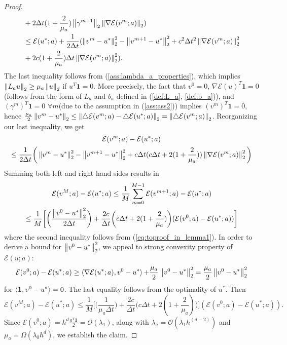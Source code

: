 \begin{thm}
\begin{proof}
\begin{align*}
			&+ 2\Delta t (1+ \frac{2}{\mu_a}) \left\lVert\gamma^{m+1}\right\rVert_{2} \left\lVert\nabla \mathcal{E}(v^m;a)\right\rVert_{2})\\
			&\leq \mathcal{E}(u^*;a) + \frac{1}{2 \Delta t}(\left\lVert v^m-u^*\right\rVert_{2}^{2} - \left\lVert v^{m+1} - u^*\right\rVert_{2}^{2} + c^2 \Delta t^2 \left\lVert\nabla \mathcal{E}(v^m;a)\right\rVert_{2}^{2}\\
			&+ 2c (1+ \frac{2}{\mu_a}) \Delta t \left\lVert\nabla \mathcal{E}(v^m;a)\right\rVert_{2}^{2}).
		\end{align*}
		The last inequality follows from (\ref{ass:lambda_a_properties}), which implies $\left\lVert L_a u\right\rVert_{2} \geq \mu_a \left\lVert u\right\rVert_{2}$ if $u^T\textbf{1}=0$. More precisely, the fact that $v^0 = 0$, $\nabla\mathcal{E}(u)^T \mathbf{1} = 0$ (follows from the form of $L_a$ and $b_a$ defined in (\ref{def:L_a}, \ref{def:b_a})), and $(\gamma^m)^T \textbf{1} = 0$ $\forall m$(due to the assumption in (\ref{ass:ass2})) implies $(v^m)^T \textbf{1} = 0$, hence $\frac{\mu_a}{2} \left\lVert v^m - u^*\right\rVert_{2} \leq \left\lVert\triangle \mathcal{E}(v^m;a) - \triangle \mathcal{E}(u^*;a)\right\rVert_{2} = \left\lVert\triangle \mathcal{E}(v^m;a)\right\rVert_{2}$. Reorganizing our last inequality, we get
		\begin{multline}
			\mathcal{E}(v^m;a) - \mathcal{E}(u^*;a) \\
			\leq \frac{1}{2\Delta t} \bigg(\left\lVert v^m - u^*\right\rVert_{2}^{2} - \left\lVert v^{m+1} - u^*\right\rVert_{2}^{2} +c\Delta t (c\Delta t + 2(1+\frac{2}{\mu_a})) \left\lVert\nabla \mathcal{E}(v^m;a)\right\rVert_{2}^{2} \bigg)
		\end{multline}
		Summing both left and right hand sides results in 
		\begin{multline}
			\mathcal{E}(v^{M};a) - \mathcal{E}(u^*;a) \leq \frac{1}{M} \sum_{m = 0}^{M-1} \mathcal{E}(v^{m+1};a) - \mathcal{E}(u^*;a) \\
			\leq \frac{1}{M} \bigg[ \bigg( \frac{\left\lVert v^0 - u^*\right\rVert_{2}^{2}}{2\Delta t}\bigg) + \frac{2c}{\Delta t} \bigg(c\Delta t + 2(1+\frac{2}{\mu_a})\bigg) (\mathcal{E}(v^0;a) - \mathcal{E}(u^*;a)) \bigg]
		\end{multline}
		where the second inequality follows from (\ref{eq:toproof_in_lemma1}). In order to derive a bound for $\left\lVert v^0 - u^*\right\rVert_{2}^{2}$, we appeal to strong convexity property of $\mathcal{E}(u;a)$:
		\begin{equation*}
			\mathcal{E}(v^0;a) - \mathcal{E}(u^*;a) \geq \mathop{\langle \nabla \mathcal{E}(u^*;a), v^0 - u^* \rangle} + \frac{\mu_a}{2} \left\lVert v^0 - u^*\right\rVert_{2}^{2} = \frac{\mu_a}{2} \left\lVert v^0 - u^*\right\rVert_{2}^{2}
		\end{equation*}
		for $\mathop{\langle \textbf{1}, v^0 - u^* \rangle} = 0$. The last equality follows from the optimality of $u^*$. Then
		\begin{equation}
			\mathcal{E}(v^{M};a) - \mathcal{E}(u^*;a) \leq \frac{1}{M} \bigg[ \bigg(\frac{1}{\mu_a \Delta t}\bigg)+ \frac{2c}{\Delta t} \bigg(c\Delta t + 2(1+\frac{2}{\mu_a})\bigg)\bigg] (\mathcal{E}(v^0;a) - \mathcal{E}(u^*;a)).
		\end{equation}
		Since $\mathcal{E}(v^0;a) = h^d \frac{a^T \textbf{1}}{2} = \mathcal{O}(\lambda_{1})$, along with $\lambda_{a} = \mathcal{O}(\lambda_{1} h^(d-2))$ and $\mu_a = \Omega(\lambda_{0} h^d)$, we establish the claim.
	\end{proof}
\end{thm}
